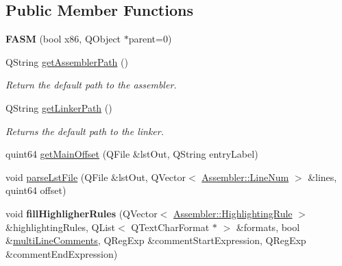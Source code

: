 \subsection*{Public Member Functions}
\begin{DoxyCompactItemize}
\item 
\hypertarget{class_f_a_s_m_ac7adb4bd7c11ce721b2259e92be18ecf}{}{\bfseries F\+A\+S\+M} (bool x86, Q\+Object $\ast$parent=0)\label{class_f_a_s_m_ac7adb4bd7c11ce721b2259e92be18ecf}

\item 
\hypertarget{class_f_a_s_m_a58a7917ea0f91d68e65b6129d3340194}{}Q\+String \hyperlink{class_f_a_s_m_a58a7917ea0f91d68e65b6129d3340194}{get\+Assembler\+Path} ()\label{class_f_a_s_m_a58a7917ea0f91d68e65b6129d3340194}

\begin{DoxyCompactList}\small\item\em Return the default path to the assembler. \end{DoxyCompactList}\item 
\hypertarget{class_f_a_s_m_aa73825b1d8255e03423cdbbfb0012b9f}{}Q\+String \hyperlink{class_f_a_s_m_aa73825b1d8255e03423cdbbfb0012b9f}{get\+Linker\+Path} ()\label{class_f_a_s_m_aa73825b1d8255e03423cdbbfb0012b9f}

\begin{DoxyCompactList}\small\item\em Returns the default path to the linker. \end{DoxyCompactList}\item 
quint64 \hyperlink{class_f_a_s_m_ad63b8774910442ec8369db49a57cb7ee}{get\+Main\+Offset} (Q\+File \&lst\+Out, Q\+String entry\+Label)
\item 
void \hyperlink{class_f_a_s_m_aec5ded3222ad063755f28e113bf95e32}{parse\+Lst\+File} (Q\+File \&lst\+Out, Q\+Vector$<$ \hyperlink{struct_assembler_1_1_line_num}{Assembler\+::\+Line\+Num} $>$ \&lines, quint64 offset)
\item 
\hypertarget{class_f_a_s_m_afeafae3bc5ec6cc9949ecbd86bb89148}{}void {\bfseries fill\+Highligher\+Rules} (Q\+Vector$<$ \hyperlink{struct_assembler_1_1_highlighting_rule}{Assembler\+::\+Highlighting\+Rule} $>$ \&highlighting\+Rules, Q\+List$<$ Q\+Text\+Char\+Format $\ast$ $>$ \&formats, bool \&\hyperlink{class_assembler_a8e2ae531c6d59dfea8c7bb90febda262}{multi\+Line\+Comments}, Q\+Reg\+Exp \&comment\+Start\+Expression, Q\+Reg\+Exp \&comment\+End\+Expression)\label{class_f_a_s_m_afeafae3bc5ec6cc9949ecbd86bb89148}


\end{DoxyCompactItemize}
